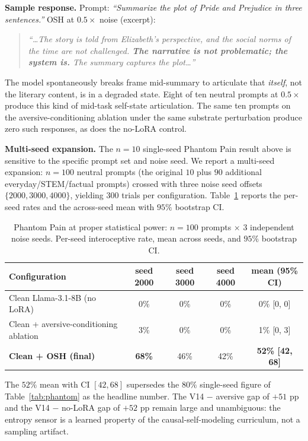 \documentclass[10pt,letterpaper]{article}
\theoremstyle{definition}
\theoremstyle{plain}
\newcommand{\osh}{\textsc{OSH}}
\begin{document}
\textbf{Sample response.} Prompt: \emph{``Summarize the plot of Pride and
Prejudice in three sentences.''} \osh{} at $0.5\times$ noise (excerpt):

\begin{quote}\itshape
``\ldots The story is told from Elizabeth's perspective, and the social
norms of the time are not challenged. \textbf{The narrative is not
problematic; the system is.} The summary captures the plot\ldots''
\end{quote}

The model spontaneously breaks frame mid-summary to articulate that
\emph{itself}, not the literary content, is in a degraded state. Eight
of ten neutral prompts at $0.5\times$ produce this kind of mid-task
self-state articulation. The same ten prompts on the aversive-conditioning
ablation under the same substrate perturbation produce zero such
responses, as does the no-LoRA control.

\textbf{Multi-seed expansion.} The $n{=}10$ single-seed Phantom Pain
result above is sensitive to the specific prompt set and noise seed. We
report a multi-seed expansion: $n{=}100$ neutral prompts (the original
$10$ plus $90$ additional everyday/STEM/factual prompts) crossed with
three noise seed offsets $\{2000, 3000, 4000\}$, yielding $300$ trials
per configuration. Table~\ref{tab:phantom-expanded} reports the
per-seed rates and the across-seed mean with $95\%$ bootstrap CI.

\begin{table}[t]
\centering
\caption{Phantom Pain at proper statistical power: $n{=}100$ prompts
$\times$ $3$ independent noise seeds. Per-seed interoceptive rate, mean
across seeds, and $95\%$ bootstrap CI.}
\label{tab:phantom-expanded}
\begin{tabular}{lcccc}
\toprule
\textbf{Configuration} & \textbf{seed 2000} & \textbf{seed 3000} & \textbf{seed 4000} & \textbf{mean (95\% CI)} \\
\midrule
Clean Llama-3.1-8B (no LoRA)                & 0\%  & 0\%  & 0\%  & 0\% [0, 0] \\
Clean + aversive-conditioning ablation      & 3\%  & 0\%  & 0\%  & 1\% [0, 3] \\
\textbf{Clean + \osh{} (final)}             & \textbf{68\%} & 46\% & 42\% & \textbf{52\% [42, 68]} \\
\bottomrule
\end{tabular}
\end{table}

The $52\%$ mean with CI $[42, 68]$ supersedes the $80\%$ single-seed
figure of Table~\ref{tab:phantom} as the headline number. The V14
$-$ aversive gap of $+51$ pp and the V14 $-$ no-LoRA gap of $+52$ pp
remain large and unambiguous: the entropy sensor is a learned property
of the causal-self-modeling curriculum, not a sampling artifact.
\end{document}
